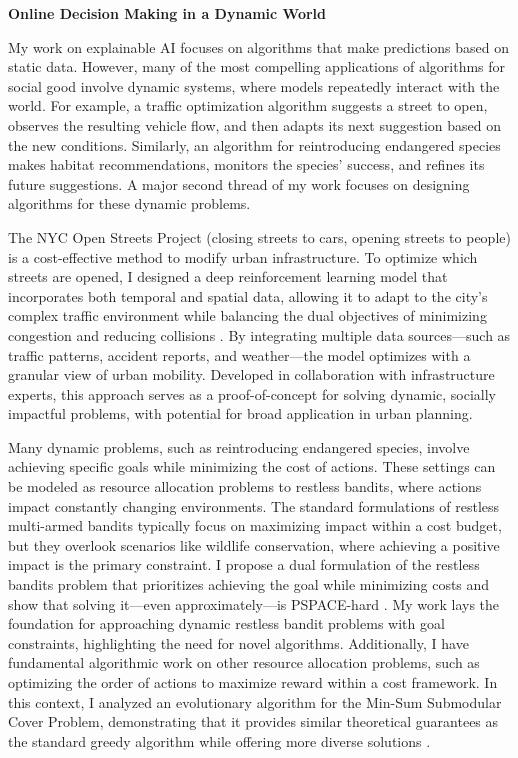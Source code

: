 \documentclass[11pt]{article}
\begin{document}
{\begin{center}
{\large \textbf{Online Decision Making in a Dynamic World}}
\end{center}

My work on explainable AI focuses on algorithms that make predictions based on static data. However, many of the most compelling applications of algorithms for social good involve dynamic systems, where models repeatedly interact with the world. For example, a traffic optimization algorithm suggests a street to open, observes the resulting vehicle flow, and then adapts its next suggestion based on the new conditions. Similarly, an algorithm for reintroducing endangered species makes habitat recommendations, monitors the species’ success, and refines its future suggestions. A major second thread of my work focuses on designing algorithms for these dynamic problems.

The NYC Open Streets Project (closing streets to cars, opening streets to people) is a cost-effective method to modify urban infrastructure. To optimize which streets are opened, I designed a deep reinforcement learning model that incorporates both temporal and spatial data, allowing it to adapt to the city's complex traffic environment while balancing the dual objectives of minimizing congestion and reducing collisions \cite{witter2024i}. By integrating multiple data sources—such as traffic patterns, accident reports, and weather—the model optimizes with a granular view of urban mobility. Developed in collaboration with infrastructure experts, this approach serves as a proof-of-concept for solving dynamic, socially impactful problems, with potential for broad application in urban planning.

Many dynamic problems, such as reintroducing endangered species, involve achieving specific goals while minimizing the cost of actions. These settings can be modeled as resource allocation problems to restless bandits, where actions impact constantly changing environments. The standard formulations of restless multi-armed bandits typically focus on maximizing impact within a cost budget, but they overlook scenarios like wildlife conservation, where achieving a positive impact is the primary constraint. I propose a dual formulation of the restless bandits problem that prioritizes achieving the goal while minimizing costs and show that solving it—even approximately—is PSPACE-hard \cite{witter2024minimizing}. My work lays the foundation for approaching dynamic restless bandit problems with goal constraints, highlighting the need for novel algorithms. Additionally, I have fundamental algorithmic work on other resource allocation problems, such as optimizing the order of actions to maximize reward within a cost framework. In this context, I analyzed an evolutionary algorithm for the Min-Sum Submodular Cover Problem, demonstrating that it provides similar theoretical guarantees as the standard greedy algorithm while offering more diverse solutions \cite{hellerstein2022local}.

}
\end{document}
